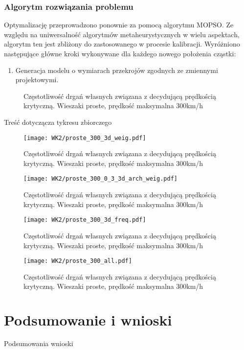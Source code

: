 \subsection{Algorytm rozwiązania problemu}
Optymalizację przeprowadzono ponownie za pomocą algorytmu MOPSO. Ze względu na uniwersalność algorytmów metaheurystycznych w wielu aspektach, algorytm ten jest zbliżony do zastosowanego w procesie kalibracji. Wyróżniono następujące główne kroki wykonywane dla każdego nowego położenia cząstki:
\begin{enumerate}
	\item Generacja modelu o wymiarach przekrojów zgodnych ze zmiennymi projektowymi.
\end{enumerate}
























\begin{figure}[h]
	\centering
	\captionsetup{justification=centering}
	\caption{Częstotliwość drgań własnych związana z decydującą prędkością krytyczną. Wieszaki proste, prędkość maksymalna 300km/h}
\end{figure}
Treść dotyczącza tykresu zbiorczego 
\begin{figure}[h]
	\centering
	\texttt{[image: WK2/proste\_300\_3d\_weig.pdf]}
	\captionsetup{justification=centering}
	\caption{Częstotliwość drgań własnych związana z decydującą prędkością krytyczną. Wieszaki proste, prędkość maksymalna 300km/h}
\end{figure}
\begin{figure}[h]
	\centering
	\texttt{[image: WK2/proste\_300\_0\_3\_3d\_arch\_weig.pdf]}
	\captionsetup{justification=centering}
	\caption{Częstotliwość drgań własnych związana z decydującą prędkością krytyczną. Wieszaki proste, prędkość maksymalna 300km/h}
\end{figure}
\begin{figure}[h]
	\centering
	\texttt{[image: WK2/proste\_300\_3d\_freq.pdf]}
	\captionsetup{justification=centering}
	\caption{Częstotliwość drgań własnych związana z decydującą prędkością krytyczną. Wieszaki proste, prędkość maksymalna 300km/h}
\end{figure}
\begin{figure}[h]
	\centering
	\texttt{[image: WK2/proste\_300\_all.pdf]}
	\captionsetup{justification=centering}
	\caption{Częstotliwość drgań własnych związana z decydującą prędkością krytyczną. Wieszaki proste, prędkość maksymalna 300km/h}
\end{figure}



\chapter{Podsumowanie i wnioski}
Podsumowania wnioski